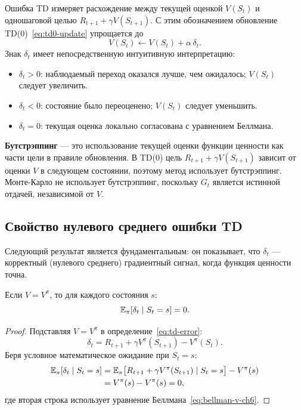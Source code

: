 Ошибка TD измеряет расхождение между текущей оценкой $V(S_t)$ и одношаговой целью $R_{t+1}+\gamma V(S_{t+1})$.  С этим обозначением обновление TD(0)~\eqref{eq:td0-update} упрощается до
\[
V(S_t) \leftarrow V(S_t) + \alpha\,\delta_t.
\]
Знак $\delta_t$ имеет непосредственную интуитивную интерпретацию:
\begin{itemize}[leftmargin=*]
  \item $\delta_t > 0$: наблюдаемый переход оказался лучше, чем ожидалось; $V(S_t)$ следует увеличить.
  \item $\delta_t < 0$: состояние было переоценено; $V(S_t)$ следует уменьшить.
  \item $\delta_t = 0$: текущая оценка локально согласована с уравнением Беллмана.
\end{itemize}

\begin{definition}[Бутстрэппинг]
\label{def:bootstrap}
\textbf{Бутстрэппинг} --- это использование текущей оценки функции ценности как части цели в правиле обновления.  В TD(0) цель $R_{t+1}+\gamma V(S_{t+1})$ зависит от оценки $V$ в следующем состоянии, поэтому метод использует бутстрэппинг.  Монте-Карло не использует бутстрэппинг, поскольку $G_t$ является истинной отдачей, независимой от $V$.
\end{definition}

\subsection{Свойство нулевого среднего ошибки TD}

Следующий результат является фундаментальным: он показывает, что $\delta_t$ --- корректный (нулевого среднего) градиентный сигнал, когда функция ценности точна.

\begin{theorem}
\label{thm:td-error-zero-mean}
Если $V = V^\pi$, то для каждого состояния $s$:
\begin{equation}
\label{eq:td-zero-mean}
\operatorname{\mathbb{E}}_\pi[\delta_t \mid S_t = s] = 0.
\end{equation}
\end{theorem}

\begin{proof}
Подставляя $V = V^\pi$ в определение~\eqref{eq:td-error}:
\[
\delta_t = R_{t+1} + \gamma V^\pi(S_{t+1}) - V^\pi(S_t).
\]
Беря условное математическое ожидание при $S_t = s$:
\begin{align*}
\operatorname{\mathbb{E}}_\pi[\delta_t \mid S_t = s]
&= \operatorname{\mathbb{E}}_\pi\bigl[R_{t+1} + \gamma V^\pi(S_{t+1}) \mid S_t = s\bigr] - V^\pi(s)\\
&= V^\pi(s) - V^\pi(s) = 0,
\end{align*}
где вторая строка использует уравнение Беллмана~\eqref{eq:bellman-v-ch6}.
\end{proof}

